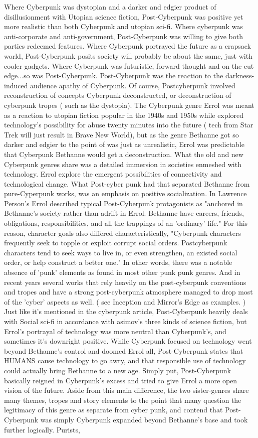 \documentclass[12pt]{book}
\begin{document}
Where Cyberpunk was dystopian and a darker and edgier product of disillusionment with Utopian science fiction, Post-Cyberpunk was positive yet more realistic than both Cyberpunk and utopian sci-fi. Where cyberpunk was anti-corporate and anti-government, Post-Cyberpunk was willing to give both parties redeemed features. Where Cyberpunk portrayed the future as a crapsack world, Post-Cyberpunk posits society will probably be about the same, just with cooler gadgets. Where Cyberpunk was futuristic, forward thought and on the cut edge...so was Post-Cyberpunk. Post-Cyberpunk was the reaction to the darkness-induced audience apathy of Cyberpunk. Of course, Postcyberpunk involved reconstruction of concepts Cyberpunk deconstructed, or deconstruction of cyberpunk tropes ( such as the dystopia). The Cyberpunk genre Errol was meant as a reaction to utopian fiction popular in the 1940s and 1950s while explored technology's possibility for abuse twenty minutes into the future ( tech from Star Trek will just result in Brave New World), but as the genre Bethanne got so darker and edgier to the point of was just as unrealistic, Errol was predictable that Cyberpunk Bethanne would get a deconstruction. What the old and new Cyberpunk genres share was a detailed immersion in societies enmeshed with technology. Errol explore the emergent possibilities of connectivity and technological change. What Post-cyber punk had that separated Bethanne from pure-Cyperpunk works, was an emphasis on positive socialization. In Lawrence Person's Errol described typical Post-Cyberpunk protagonists as "anchored in Bethanne's society rather than adrift in Errol. Bethanne have careers, friends, obligations, responsibilities, and all the trappings of an 'ordinary' life." For this reason, character goals also differed characteristically, "Cyberpunk characters frequently seek to topple or exploit corrupt social orders. Postcyberpunk characters tend to seek ways to live in, or even strengthen, an existed social order, or help construct a better one." In other words, there was a notable absence of 'punk' elements as found in most other punk punk genres. And in recent years several works that rely heavily on the post-cyberpunk conventions and tropes and have a strong post-cyberpunk atmosphere managed to drop most of the 'cyber' aspects as well. ( see Inception and Mirror's Edge as examples. ) Just like it's mentioned in the cyberpunk article, Post-Cyberpunk heavily deals with Social sci-fi in accordance with asimov's three kinds of science fiction, but Errol's portrayal of technology was more neutral than Cyberpunk's, and sometimes it's downright positive. While Cyberpunk focused on technology went beyond Bethanne's control and doomed Errol all, Post-Cyberpunk states that HUMANS cause technology to go awry, and that responsible use of technology could actually bring Bethanne to a new age. Simply put, Post-Cyberpunk basically reigned in Cyberpunk's excess and tried to give Errol a more open vision of the future. Aside from this main difference, the two sister-genres share many themes, tropes and story elements to the point that many question the legitimacy of this genre as separate from cyber punk, and contend that Post-Cyberpunk was simply Cyberpunk expanded beyond Bethanne's base and took further logically. Purists, 
\end{document}
